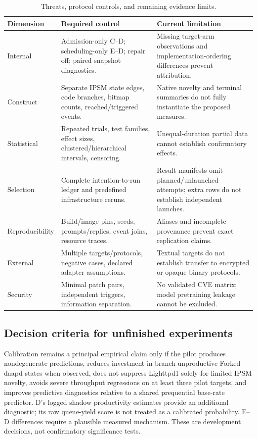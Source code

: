 \documentclass[final,5p,times,number]{elsarticle}
\begin{document}
\begin{table}[!tbp]
\centering\small
\caption{Threats, protocol controls, and remaining evidence limits.}
\label{tab:threats}
\begin{tabularx}{\textwidth}{l Y Y}
\toprule
Dimension & Required control & Current limitation \\
\midrule
Internal & Admission-only C--D; scheduling-only E--D; repair off; paired snapshot diagnostics. & Missing target-arm observations and implementation-ordering differences prevent attribution. \\
Construct & Separate IPSM state edges, code branches, bitmap counts, reached/triggered events. & Native novelty and terminal summaries do not fully instantiate the proposed measures. \\
Statistical & Repeated trials, test families, effect sizes, clustered/hierarchical intervals, censoring. & Unequal-duration partial data cannot establish confirmatory effects. \\
Selection & Complete intention-to-run ledger and predefined infrastructure reruns. & Result manifests omit planned/unlaunched attempts; extra rows do not establish independent launches. \\
Reproducibility & Build/image pins, seeds, prompts/replies, event joins, resource traces. & Aliases and incomplete provenance prevent exact replication claims. \\
External & Multiple targets/protocols, negative cases, declared adapter assumptions. & Textual targets do not establish transfer to encrypted or opaque binary protocols. \\
Security & Minimal patch pairs, independent triggers, information separation. & No validated CVE matrix; model pretraining leakage cannot be excluded. \\
\bottomrule
\end{tabularx}
\end{table}

\subsection{Decision criteria for unfinished experiments}
Calibration remains a principal empirical claim only if the pilot produces nondegenerate predictions, reduces investment in branch-unproductive Forked-daapd states when observed, does not suppress Lighttpd1 solely for limited IPSM novelty, avoids severe throughput regressions on at least three pilot targets, and improves predictive diagnostics relative to a shared prequential base-rate predictor. D's logged shadow productivity estimates provide an additional diagnostic; its raw queue-yield score is not treated as a calibrated probability. E--D differences require a plausible measured mechanism. These are development decisions, not confirmatory significance tests.
\end{document}
